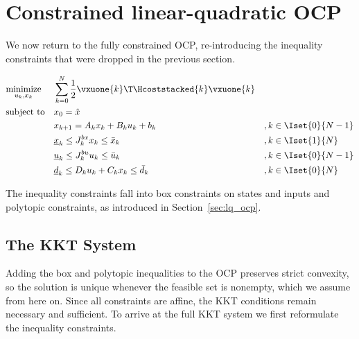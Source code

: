 \section{Constrained linear-quadratic OCP}

We now return to the fully constrained OCP, re-introducing the inequality constraints that were dropped in the previous section.

\[
\begin{aligned}
& \underset{u_k, x_k}{\text{minimize}} & & \sum_{k=0}^{N} \frac{1}{2} \vxuone{k}\T \Hcoststacked{k} \vxuone{k} & &                      \\
& \text{subject to}                    & & x_0 = \hat{x}                                                       & &                      \\
&                                      & & x_{k+1} = A_k x_k + B_k u_k + b_k                                   & & ,k\in\Iset{0}{N-1}   \\
&                                      & & \underline{x}_k \leq J_k^{bx} x_k \leq \bar{x}_k                    & & ,k\in\Iset{1}{N}     \\
&                                      & & \underline{u}_k \leq J_k^{bu} u_k \leq \bar{u}_k                    & & ,k\in\Iset{0}{N-1}   \\
&                                      & & \underline{d}_k \leq D_k u_k + C_k x_k \leq \bar{d}_k               & & ,k\in\Iset{0}{N}
\end{aligned}
\]

The inequality constraints fall into box constraints on states and inputs and polytopic constraints, as introduced in Section~\ref{sec:lq_ocp}.

\subsection{The KKT System}
\label{sec:kkt_constrained}

Adding the box and polytopic inequalities to the OCP preserves strict convexity, so the solution is unique whenever the feasible set is nonempty, which we assume from here on.
Since all constraints are affine, the KKT conditions remain necessary and sufficient.
To arrive at the full KKT system we first reformulate the inequality constraints.

